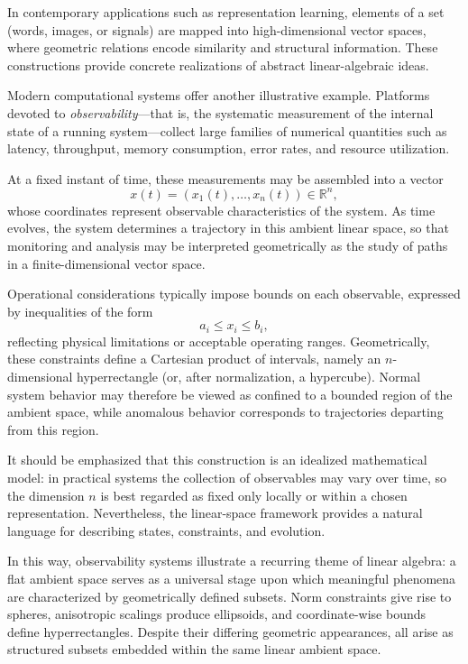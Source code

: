 In contemporary applications such as representation learning, elements of a
set (words, images, or signals) are mapped into high-dimensional vector spaces,
where geometric relations encode similarity and structural information.
These constructions provide concrete realizations of abstract linear-algebraic
ideas.

\medskip

Modern computational systems offer another illustrative example.
Platforms devoted to \emph{observability}---that is, the systematic measurement
of the internal state of a running system---collect large families of numerical
quantities such as latency, throughput, memory consumption, error rates, and
resource utilization.

\medskip

At a fixed instant of time, these measurements may be assembled into a vector
\[
x(t) = (x_1(t),\dots,x_n(t)) \in \mathbb{R}^n,
\]
whose coordinates represent observable characteristics of the system.
As time evolves, the system determines a trajectory in this ambient linear
space, so that monitoring and analysis may be interpreted geometrically as
the study of paths in a finite-dimensional vector space.

\medskip

Operational considerations typically impose bounds on each observable,
expressed by inequalities of the form
\[
a_i \le x_i \le b_i,
\]
reflecting physical limitations or acceptable operating ranges.
Geometrically, these constraints define a Cartesian product of intervals,
namely an $n$-dimensional hyperrectangle (or, after normalization, a
hypercube).
Normal system behavior may therefore be viewed as confined to a bounded region
of the ambient space, while anomalous behavior corresponds to trajectories
departing from this region.

\medskip

It should be emphasized that this construction is an idealized mathematical
model: in practical systems the collection of observables may vary over time,
so the dimension $n$ is best regarded as fixed only locally or within a chosen
representation.
Nevertheless, the linear-space framework provides a natural language for
describing states, constraints, and evolution.

\medskip

In this way, observability systems illustrate a recurring theme of linear
algebra: a flat ambient space serves as a universal stage upon which meaningful
phenomena are characterized by geometrically defined subsets.
Norm constraints give rise to spheres, anisotropic scalings produce ellipsoids,
and coordinate-wise bounds define hyperrectangles.
Despite their differing geometric appearances, all arise as structured subsets
embedded within the same linear ambient space.


